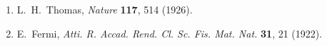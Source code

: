 

\begin{enumerate}
  \item {}\label{ch5-ref-1}
  L.~H.~Thomas, \textit{Nature} \textbf{117}, 514 (1926).

  \item {}\label{ch5-ref-2}
  E.~Fermi, \textit{Atti. R. Accad. Rend. Cl. Sc. Fis. Mat. Nat.}
  \textbf{31}, 21 (1922).
\end{enumerate}
